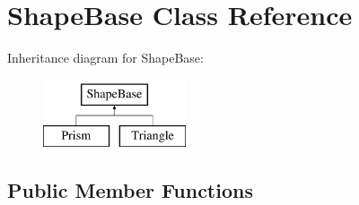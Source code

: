 \hypertarget{classShapeBase}{}\section{Shape\+Base Class Reference}
\label{classShapeBase}
Inheritance diagram for Shape\+Base\+:\begin{figure}[H]
\begin{center}
\leavevmode
\includegraphics[height=2.000000cm]{classShapeBase}
\end{center}
\end{figure}
\subsection*{Public Member Functions}
